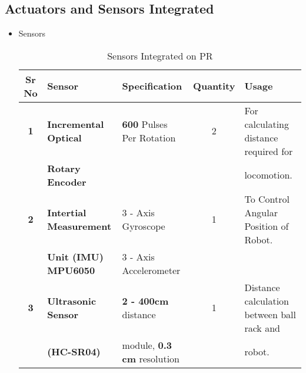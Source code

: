     \subsection{Actuators and Sensors Integrated}
        \begin{itemize}
            \item Sensors
                \begin{table}[h]
                    \caption {Sensors Integrated on PR} \label{Sensors_PR}  \small
                    \begin{tabular}{|c|l|l|c|l|}
                        \hline  \hline
                        \textbf{Sr No}  & \textbf{Sensor}                   & \textbf{Specification}                & \textbf{Quantity} & \textbf{Usage}                                      \\ \hline   \hline
                        \textbf{1}      & \textbf{Incremental Optical}      & \textbf{600} Pulses Per Rotation      &        2          & For calculating distance required for               \\
                                        & \textbf{Rotary Encoder}           &                                       &                   & locomotion.                                         \\ \hline         
                        \textbf{2}      & \textbf{Intertial Measurement}    & 3 - Axis Gyroscope                    &        1          & To Control Angular Position of  Robot.              \\ 
                                        & \textbf{Unit (IMU) MPU6050}       & 3 - Axis Accelerometer                &                   &                                                     \\ \hline                                     
                        \textbf{3}      & \textbf{Ultrasonic Sensor}        & \textbf{2 - 400cm} distance           &        1          & Distance calculation between ball rack and          \\ 
                                        & \textbf{(HC-SR04)}                & module, \textbf{0.3 cm} resolution    &                   & robot.                                              \\ \hline   \hline
                    \end{tabular}
                \end{table}
                

\end{itemize}
